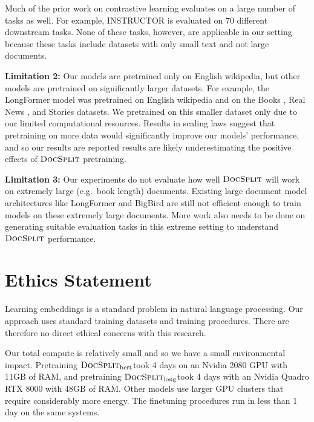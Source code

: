 \documentclass[11pt]{article}
\newcommand{\our}{\mbox{\textsc{DocSplit}}}
\newcommand{\ourbert}{$\our_{\mathrm{bert}}$}
\newcommand{\ourlong}{$\our_{\mathrm{long}}$}
\begin{document}
Much of the prior work on contrastive learning evaluates on a large number of tasks as well.
For example, INSTRUCTOR \cite{Su2022OneEA} is evaluated on 70 different downstream tasks.
None of these tasks, however, are applicable in our setting because these tasks include datasets with only small text and not large documents.

\textbf{Limitation 2:}
Our models are pretrained only on English wikipedia,
but other models are pretrained on significantly larger datasets.
For example, the LongFormer model was pretrained on English wikipedia and on the Books \citep{zhu2015aligning}, Real News \citep{zellers2019defending}, and Stories \citep{zellers2019defending} datasets.
We pretrained on this smaller dataset only due to our limited computational resources.
Results in scaling laws \citep{kaplan2020scaling} suggest that pretraining on more data would significantly improve our models' performance,
and so our results are reported results are likely underestimating the positive effects of $\our$ pretraining.

\textbf{Limitation 3:}
Our experiments do not evaluate how well $\our$ will work on extremely large (e.g.\ book length) documents.
Existing large document model architectures like LongFormer \cite{Beltagy2020LongformerTL} and BigBird \cite{Zaheer2020BigBT} are still not efficient enough to train models on these extremely large documents.
More work also needs to be done on generating suitable evaluation tasks in this extreme setting to understand $\our$ performance.

\section*{Ethics Statement}

Learning embeddings is a standard problem in natural language processing.
Our approach uses standard training datasets and training procedures.
There are therefore no direct ethical concerns with this research.

Our total compute is relatively small and so we have a small environmental impact.
Pretraining \ourbert took 4 days on an Nvidia 2080 GPU with 11GB of RAM,
and pretraining \ourlong took 4 days with an Nvidia Quadro RTX 8000 with 48GB of RAM.
Other models use larger GPU clusters that require considerably more energy.
The finetuning procedures run in less than 1 day on the same systems.
\end{document}
